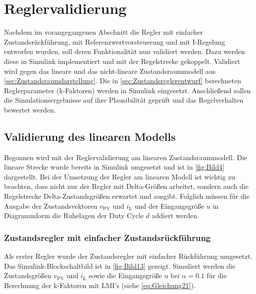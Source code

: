 \section{Reglervalidierung} \label{sec:Reglervalidierung}

Nachdem im vorangegangenen Abschnitt die Regler mit einfacher Zustandsrückführung, mit Referenzwertvorsteuerung und mit I-Regelung entworfen wurden, soll deren Funktionalität nun validiert werden. Dazu werden diese in Simulink implementiert und mit der Regelstrecke gekoppelt. Validiert wird gegen das lineare und das nicht-lineare Zustandsraummodell aus \autoref{sec:Zustandsraumdarstellung}. Die in \autoref{sec:Zustandsreglerentwurf} berechneten Reglerparameter (\zB k-Faktoren) werden in Simulink eingesetzt. Anschließend sollen die Simulationsergebnisse auf ihre Plausibilität geprüft und das Regelverhalten bewertet werden. 

\subsection{Validierung des linearen Modells} \label{sec:Vergleich_linear}

Begonnen wird mit der Reglervalidierung am linearen Zustandsraummodell. Die lineare Strecke wurde bereits in Simulink umgesetzt und ist in \autoref{fig:Bild4} dargestellt. Bei der Umsetzung der Regler am linearen Modell ist wichtig zu beachten, dass nicht nur der Regler mit Delta-Größen arbeitet, sondern auch die Regelstrecke Delta-Zustandsgrößen erwartet und ausgibt. Folglich müssen für die Ausgabe der Zustandsvektoren $v_{\mathrm{PV}}$ und $i_{\mathrm{L}}$ und der Eingangsgröße $u$ in Diagrammform die Ruhelagen \bzw der Duty Cycle $d$ addiert werden.

\subsubsection{Zustandsregler mit einfacher Zustandsrückführung}

Als erster Regler wurde der Zustandsregler mit einfacher Rückführung umgesetzt. Das Simulink-Blockschaltbild ist in \autoref{fig:Bild13} gezeigt. Simuliert werden die Zustandsgrößen $v_{\mathrm{PV}}$ und $i_{\mathrm{L}}$ sowie die Eingangsgröße $u$ bei $\alpha = 0.1$ für die Berechnung der k-Faktoren mit LMI's (siehe \autoref{eq:Gleichung21}).


